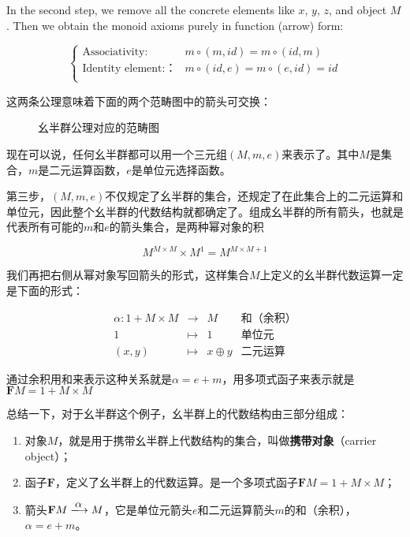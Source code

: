 \documentclass{article}
\begin{document}
\begin{example}
In the second step, we remove all the concrete elements like $x$, $y$, $z$, and object $M$. Then we obtain the monoid axioms purely in function (arrow) form:

\[
\begin{cases}
\text{Associativity:} & m \circ (m, id) = m \circ (id, m) \\
\text{Identity element:：} & m \circ (id, e) = m \circ (e, id) = id \\
\end{cases}
\]

这两条公理意味着下面的两个范畴图中的箭头可交换：

\begin{figure}[htbp]
\centering
{}
\quad
{}
\caption{幺半群公理对应的范畴图}
\end{figure}

现在可以说，任何幺半群都可以用一个三元组$(M, m, e)$来表示了。其中$M$是集合，$m$是二元运算函数，$e$是单位元选择函数。

第三步，$(M, m, e)$不仅规定了幺半群的集合，还规定了在此集合上的二元运算和单位元，因此整个幺半群的代数结构就都确定了。组成幺半群的所有箭头，也就是代表所有可能的$m$和$e$的箭头集合，是两种幂对象的积

\[
M^{M \times M} \times M^1 = M^{M \times M + 1}
\]

我们再把右侧从幂对象写回箭头的形式，这样集合$M$上定义的幺半群代数运算一定是下面的形式：

\[
\begin{array}{rcll}
\alpha : 1 + M \times M & \longrightarrow & M & \text{和（余积）}\\
1 & \longmapsto & 1 & \text{单位元}  \\
(x, y) & \longmapsto & x \oplus y & \text{二元运算}
\end{array}
\]

通过余积用和来表示这种关系就是$\alpha = e + m$，用多项式函子来表示就是$\mathbf{F} M = 1 + M \times M$

总结一下，对于幺半群这个例子，幺半群上的代数结构由三部分组成：

\begin{enumerate}
  \item 对象$M$，就是用于携带幺半群上代数结构的集合，叫做\textbf{携带对象}（carrier object）；
  \item 函子$\mathbf{F}$，定义了幺半群上的代数运算。是一个多项式函子$\mathbf{F} M = 1 + M \times M$；
  \item 箭头$\mathbf{F} M \arrowto{\alpha} M$，它是单位元箭头$e$和二元运算箭头$m$的和（余积），$\alpha = e + m$。
\end{enumerate}


\end{example}
\end{document}
